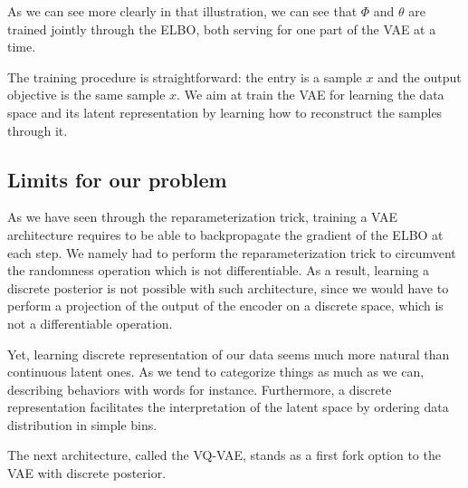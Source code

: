 As we can see more clearly in that illustration, we can see that $\Phi$ and $\theta$ are trained jointly through the ELBO, both serving for one part of the VAE at a time.
\medskip

The training procedure is straightforward: the entry is a sample $x$ and the output objective is the same sample $x$. We aim at train the VAE for learning the data space and its latent representation by learning how to reconstruct the samples through it.

\subsection{Limits for our problem}

As we have seen through the reparameterization trick, training a VAE architecture requires to be able to backpropagate
the gradient of the ELBO at each step.
We namely had to perform the reparameterization trick to circumvent the randomness operation which is not differentiable.
As a result, learning a discrete posterior is not possible with such architecture, since we would have to perform a projection
of the output of the encoder on a discrete space, which is not a differentiable operation.
\medskip

Yet, learning discrete representation of our data seems much more natural than continuous latent ones.
As we tend to categorize things as much as we can, describing behaviors with words for instance.
Furthermore, a discrete representation facilitates the interpretation of the latent space by ordering data distribution in simple bins.
\medskip

The next architecture, called the VQ-VAE, stands as a first fork option to the VAE with discrete posterior.


